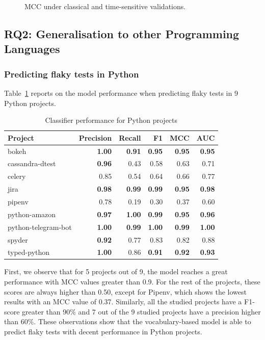 \begin{figure}
\begin{minipage}[b]{0.4\textwidth}
    \caption{MCC under classical and time-sensitive validations.}
    \label{fig:mcc-java}
  \end{minipage}
\end{figure}

\subsection{RQ2: Generalisation to other Programming Languages}
\subsubsection{Predicting flaky tests in Python}
Table~\ref{python} reports on the model performance when predicting flaky tests in 9 Python projects. 

\begin{table}[t]
\centering
\caption{Classifier performance for Python projects}
\label{python}
 \begin{tabular}{l|r r r r r} 
 \toprule
 \textbf{Project} & \textbf{Precision} & \textbf{Recall} & \textbf{F1} & \textbf{MCC} & \textbf{AUC} \\ [0.25ex]
 \midrule
 bokeh & \textbf{1.00} & \textbf{0.91} & \textbf{0.95} & \textbf{0.95} & \textbf{0.95} \\
 cassandra-dtest & \textbf{0.96} & 0.43 & 0.58 & 0.63 & 0.71 \\
 celery & 0.85 & 0.54 & 0.64 & 0.66 & 0.77 \\
 jira & \textbf{0.98} & \textbf{0.99} & \textbf{0.99} & \textbf{0.95} & \textbf{0.98} \\
 pipenv & 0.78 & 0.19 & 0.30 & 0.37 & 0.60 \\ 
 python-amazon & \textbf{0.97} & \textbf{1.00} & \textbf{0.99} & \textbf{0.95} & \textbf{0.96} \\ 
 python-telegram-bot & \textbf{1.00} & \textbf{0.99} & \textbf{1.00} & \textbf{0.99} & \textbf{1.00} \\ 
 spyder & \textbf{0.92} & 0.77 & 0.83 & 0.82 & 0.88 \\ 
 typed-python & \textbf{1.00} & 0.86 & \textbf{0.91} & \textbf{0.92} & \textbf{0.93} \\ 
 \bottomrule
\end{tabular}
\end{table}

First, we observe that for 5 projects out of 9, the model reaches a great performance with MCC values greater than 0.9. 
For the rest of the projects, these scores are always higher than 0.50, except for Pipenv, which shows the lowest results with an MCC value of 0.37.
Similarly, all the studied projects have a F1-score greater than 90\% and 7 out of the 9 studied projects have a precision higher than 60\%.
These observations show that the vocabulary-based model is able to predict flaky tests with decent performance in Python projects.

